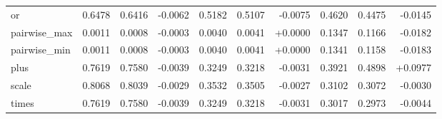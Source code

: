 \begin{table}[H]
\begin{tabular}{l | r r r | r r r | r r r}
  or & 0.6478 & 0.6416 & -0.0062 & 0.5182 & 0.5107 & -0.0075 & 0.4620 & 0.4475 & -0.0145 \\
  pairwise\_max & 0.0011 & 0.0008 & -0.0003 & 0.0040 & 0.0041 & +0.0000 & 0.1347 & 0.1166 & -0.0182 \\
  pairwise\_min & 0.0011 & 0.0008 & -0.0003 & 0.0040 & 0.0041 & +0.0000 & 0.1341 & 0.1158 & -0.0183 \\
  plus & 0.7619 & 0.7580 & -0.0039 & 0.3249 & 0.3218 & -0.0031 & 0.3921 & 0.4898 & +0.0977 \\
  scale & 0.8068 & 0.8039 & -0.0029 & 0.3532 & 0.3505 & -0.0027 & 0.3102 & 0.3072 & -0.0030 \\
  times & 0.7619 & 0.7580 & -0.0039 & 0.3249 & 0.3218 & -0.0031 & 0.3017 & 0.2973 & -0.0044 \\
\bottomrule
\end{tabular}
\end{table}
